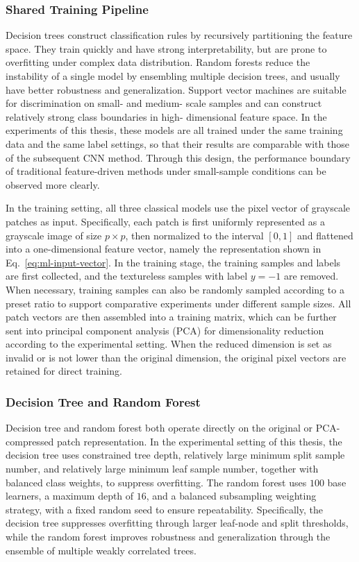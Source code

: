 \subsubsection{Shared Training Pipeline}
\par Decision trees \cite{breiman2017classification} construct classification
rules by recursively partitioning the feature space. They train quickly and
have strong interpretability, but are prone to overfitting under complex data
distribution. Random forests \cite{breiman2001random} reduce the instability of
a single model by ensembling multiple decision trees, and usually have better
robustness and generalization. Support vector machines
\cite{cortes1995support} are suitable for discrimination on small- and medium-
scale samples and can construct relatively strong class boundaries in high-
dimensional feature space. In the experiments of this thesis, these models are
all trained under the same training data and the same label settings, so that
their results are comparable with those of the subsequent CNN method. Through
this design, the performance boundary of traditional feature-driven methods
under small-sample conditions can be observed more clearly.

\par In the training setting, all three classical models use the pixel vector of
grayscale patches as input. Specifically, each patch is first uniformly
represented as a grayscale image of size $p\times p$, then normalized to the
interval $[0,1]$ and flattened into a one-dimensional feature vector, namely
the representation shown in Eq.~\eqref{eq:ml-input-vector}. In the training
stage, the training samples and labels are first collected, and the
textureless samples with label $y=-1$ are removed. When necessary, training
samples can also be randomly sampled according to a preset ratio to support
comparative experiments under different sample sizes. All patch vectors are
then assembled into a training matrix, which can be further sent into
principal component analysis (PCA) for dimensionality reduction according to
the experimental setting. When the reduced dimension is set as invalid or is
not lower than the original dimension, the original pixel vectors are retained
for direct training.

\subsubsection{Decision Tree and Random Forest}
\par Decision tree and random forest both operate directly on the original or
PCA-compressed patch representation. In the experimental setting of this
thesis, the decision tree uses constrained tree depth, relatively large minimum
split sample number, and relatively large minimum leaf sample number, together
with balanced class weights, to suppress overfitting. The random forest uses
$100$ base learners, a maximum depth of $16$, and a balanced subsampling
weighting strategy, with a fixed random seed to ensure repeatability.
Specifically, the decision tree suppresses overfitting through larger leaf-node
and split thresholds, while the random forest improves robustness and
generalization through the ensemble of multiple weakly correlated trees.

